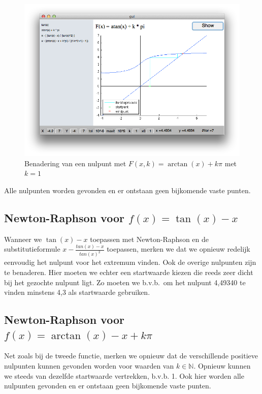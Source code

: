 \documentclass[12pt,a4paper]{article}
\begin{document}
\begin{figure}
\begin{center}
 \includegraphics[width=120mm]{resources/arctan.png}
 \caption{Benadering van een nulpunt met $F(x,k) = \arctan(x) + k\pi$ met $k=1$}
  \label{fig:arctan}
\end{center}
\end{figure}

Alle nulpunten worden gevonden en er ontstaan geen bijkomende vaste punten.

\subsection{Newton-Raphson voor $f(x) = \tan(x) - x$}

Wanneer we $\tan(x) - x$ toepassen met Newton-Raphson en de substitutieformule $x - \frac{tan(x) - x}{tan(x)^2}$ toepassen, merken we dat we opnieuw redelijk eenvoudig het nulpunt voor het extremum vinden. Ook de overige nulpunten zijn te benaderen. Hier moeten we echter een startwaarde kiezen die reeds zeer dicht bij het gezochte nulpunt ligt. Zo moeten we b.v.b.\ om het nulpunt 4,49340 te vinden minstens 4,3 als startwaarde gebruiken.

\subsection{Newton-Raphson voor $f(x) = \arctan(x) - x + k\pi$}

Net zoals bij de tweede functie, merken we opnieuw dat de verschillende positieve nulpunten kunnen gevonden worden voor waarden van $k \in \mathbb{N}$. Opnieuw kunnen we steeds van dezelfde startwaarde vertrekken, b.v.b. 1. Ook hier worden alle nulpunten gevonden en er ontstaan geen bijkomende vaste punten.
\end{document}
